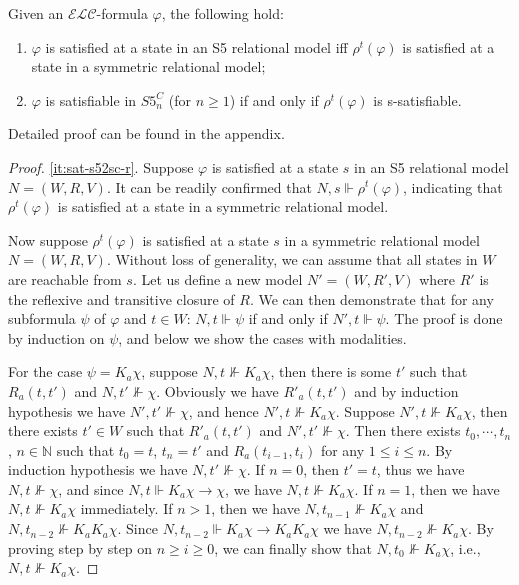 \documentclass{article}
\renewcommand{\phi}{\varphi}
\newcommand{\ra}{\rightarrow}
\newcommand{\mbN}{\mathbb{N}}
\newcommand{\langc}{\ensuremath{\mathcal{ELC}}\xspace}
\begin{document}
\begin{propositionrep}\label{lem:sat-s52sc}
Given an \langc-formula $\phi$, the following hold:
\begin{enumerate}
\item \label{it:sat-s52sc-r} $\phi$ is satisfied at a state in an S5 relational model iff $\rho^t(\phi)$ is satisfied at a state in a symmetric relational model;
\item \label{it:sat-s52sc} $\phi$ is satisfiable in $S5^C_n$ (for $n \geq 1$) if and only if $\rho^t(\phi)$ is s-satisfiable.
\end{enumerate}
\end{propositionrep}
\begin{inlineproof}
Detailed proof can be found in the appendix.
\end{inlineproof}
\begin{proof}
\ref{it:sat-s52sc-r}. Suppose $\phi$ is satisfied at a state $s$ in an S5 relational model $N=(W,R,V)$. It can be readily confirmed that $N,s\Vdash\rho^t(\phi)$, indicating that $\rho^t(\phi)$ is satisfied at a state in a symmetric relational model.

Now suppose $\rho^t(\phi)$ is satisfied at a state $s$ in a symmetric relational model $N=(W,R,V)$. Without loss of generality, we can assume that all states in $W$ are reachable from $s$. Let us define a new model $N'=(W,R',V)$ where $R'$ is the reflexive and transitive closure of $R$. We can then demonstrate that for any subformula $\psi$ of $\phi$ and $t\in W$: $N,t\Vdash\psi$ if and only if $N',t\Vdash\psi$. The proof is done by induction on $\psi$, and below we show the cases with modalities.

For the case $\psi = K_a\chi$, suppose $N,t\not\Vdash K_a\chi$, then there is some $t'$ such that $R_a(t,t')$ and $N,t'\not\Vdash\chi$. Obviously we have $R'_a(t,t')$ and by induction hypothesis we have $N',t'\not\Vdash\chi$, and hence $N',t\not\Vdash K_a\chi$.
%
Suppose $N',t\not\Vdash K_a\chi$, then there exists $t'\in W$ such that $R'_a(t,t')$ and $N',t'\not\Vdash\chi$. Then there exists $t_0,\cdots,t_n$, $n\in\mbN$ such that $t_0=t$, $t_n=t'$ and $R_a(t_{i-1},t_i)$ for any $1\leq i\leq n$. By induction hypothesis we have $N,t'\not\Vdash\chi$. If $n=0$, then $t'=t$, thus we have $N,t\not\Vdash\chi$, and since $N,t\Vdash K_a\chi\ra \chi$, we have $N,t\not\Vdash K_a\chi$. If $n=1$, then we have $N,t\not\Vdash K_a\chi$ immediately. If $n>1$, then we have $N,t_{n-1}\not\Vdash K_a\chi$ and $N,t_{n-2}\not\Vdash K_aK_a\chi$. Since $N,t_{n-2}\Vdash K_a\chi\ra K_aK_a\chi$ we have $N,t_{n-2}\not\Vdash K_a\chi$. By proving step by step on $n\geq i\geq 0$, we can finally show that $N,t_0\not\Vdash K_a\chi$, i.e., $N,t\not\Vdash K_a\chi$.


\end{proof}
\end{document}
